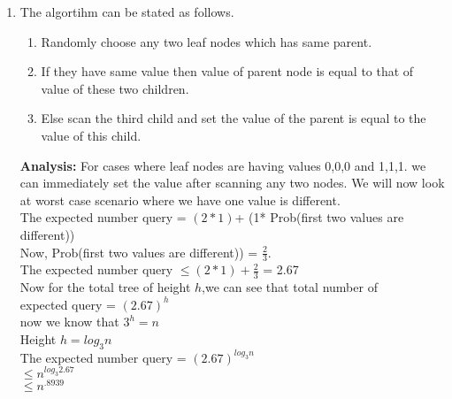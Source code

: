 \documentclass{assignment}
\begin{document}
\begin{problemlist}
\begin{problem}
\begin{answer}
\begin{enumerate}
\item

The algortihm can be stated as follows.
\begin{enumerate}
\item Randomly choose any two leaf nodes which has same parent.
\item If they have same value then value of parent node is equal to that of value of these two children.
\item Else scan the third child and set the value of the parent is equal to the value of this child.
\end{enumerate}

\textbf{Analysis:}
For cases where leaf nodes are having values {0,0,0} and {1,1,1}. we can immediately set the value after scanning any two nodes.
We will now look at worst case scenario where we have one value is different. \\

The expected number query = $(2*1)$+ (1* Prob(first two values are different))\\

Now, Prob(first two values are different)) = $\frac{2}{3}$.\\

The expected number query $\leq (2*1) + \frac{2}{3}$ = 2.67\\

Now for the total tree of height $h$,we can see that total number of \\expected query = $(2.67)^h$ \\

now  we know that $3^h = n$\\

Height $h = log_3 n$\\

The expected number query = $(2.67)^{log_3 n}$\\

$\leq n^{log_3 2.67} $\\

$\leq n^{.8939} $

\end{enumerate}
\end{answer}
\end{problem}


\end{problemlist}
\end{document}
